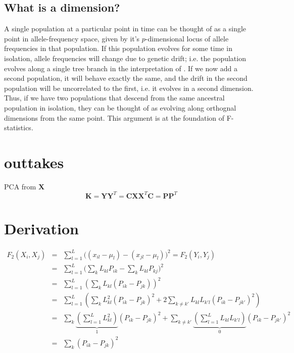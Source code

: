 \documentclass[10pt,a4paper]{article}
\newcommand{\MX}{\mathbf{X}} %
\newcommand{\MC}{\mathbf{C}} %
\newcommand{\MY}{\mathbf{Y}} %
\newcommand{\MP}{\mathbf{P}} %
\newcommand{\MK}{\mathbf{K}} %
\begin{document}
	
	
	
	\subsection{What is a dimension?}
	A single population at a particular point in time can be thought of as a single point in allele-frequency space, given by it's $p$-dimensional locus of allele frequencies in that population. If this population evolves for some time in isolation, allele frequencies will change due to genetic drift; i.e. the population evolves along a single tree branch in the interpretation of \cite{patterson2012}. If we now add a second population, it will behave exactly the same, and the drift in the second population will be uncorrelated to the first, i.e. it evolves in a second dimension. Thus, if we have two populations that descend from the same ancestral population in isolation, they can be thought of as evolving along orthognal dimensions from the same point. This argument is at the foundation of F-statistics.
	
	
	\section{outtakes}
	PCA from $\MX$
	\begin{equation}
	\MK = \MY \MY^T = \MC\MX\MX^T \MC = \MP\MP^T
	\end{equation}

\appendix
\section{Derivation}\label{appendix:fonpc}
\begin{eqnarray}
F_2(X_i, X_j) &=& \sum_{l=1}^L \big( (x_{il} - \mu_l) -(x_{jl} -\mu_l)\big)^2 = F_2(Y_i, Y_j)\nonumber\\
&=& \sum_{l=1}^L \big( \sum_k L_{kl}P_{ik} - \sum_kL_{kl}P_{kj}\big)^2\nonumber\\
&=& \sum_{l=1}^L \left( \sum_k L_{kl} (P_{ik} -P_{jk}) \right)^2\nonumber\\
&=& \sum_{l=1}^L \left( \sum_k L_{kl}^2 (P_{ik} -P_{jk})^2 + 2\sum_{k\neq k'} L_{kl}L_{k'l}(P_{ik} - P_{jk'})^2 \right)\nonumber\\
&=& \sum_k \underbrace{\left(\sum_{l=1}^L L_{kl}^2\right)}_1 (P_{ik} -P_{jk})^2 + \sum_{k\neq k'}\underbrace{\left(\sum_{l=1}^L L_{kl}L_{k'l}\right)}_{0} (P_{ik} - P_{jk'})^2\nonumber\\
&=& \sum_k (P_{ik} - P_{jk})^2
\end{eqnarray}
\end{document}
